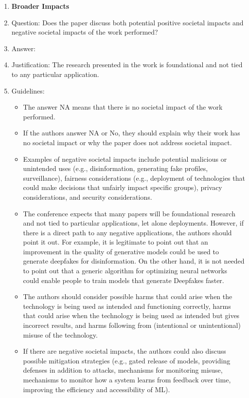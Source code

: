 \documentclass{article}
\theoremstyle{plain}
\theoremstyle{definition}
\theoremstyle{remark}
\theoremstyle{plain}
\begin{document}
\begin{enumerate}
\item {\bf Broader Impacts}
    \item[] Question: Does the paper discuss both potential positive societal impacts and negative societal impacts of the work performed?
    \item[] Answer: \answerNA{} %
    \item[] Justification: The research presented in the work is foundational and not tied to any particular application.
    \item[] Guidelines:
    \begin{itemize}
        \item The answer NA means that there is no societal impact of the work performed.
        \item If the authors answer NA or No, they should explain why their work has no societal impact or why the paper does not address societal impact.
        \item Examples of negative societal impacts include potential malicious or unintended uses (e.g., disinformation, generating fake profiles, surveillance), fairness considerations (e.g., deployment of technologies that could make decisions that unfairly impact specific groups), privacy considerations, and security considerations.
        \item The conference expects that many papers will be foundational research and not tied to particular applications, let alone deployments. However, if there is a direct path to any negative applications, the authors should point it out. For example, it is legitimate to point out that an improvement in the quality of generative models could be used to generate deepfakes for disinformation. On the other hand, it is not needed to point out that a generic algorithm for optimizing neural networks could enable people to train models that generate Deepfakes faster.
        \item The authors should consider possible harms that could arise when the technology is being used as intended and functioning correctly, harms that could arise when the technology is being used as intended but gives incorrect results, and harms following from (intentional or unintentional) misuse of the technology.
        \item If there are negative societal impacts, the authors could also discuss possible mitigation strategies (e.g., gated release of models, providing defenses in addition to attacks, mechanisms for monitoring misuse, mechanisms to monitor how a system learns from feedback over time, improving the efficiency and accessibility of ML).
    \end{itemize}
    

\end{enumerate}
\end{document}

